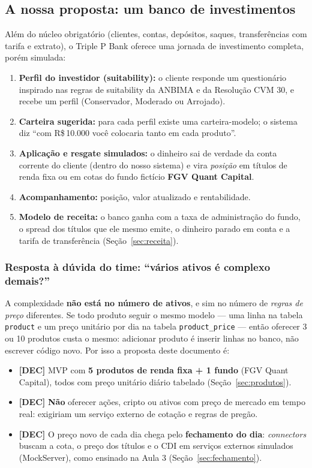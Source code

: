 \documentclass[11pt,a4paper]{article}
\newcommand{\banco}{Triple P Bank}            %
\newcommand{\fundo}{FGV Quant Capital}     %
\newcommand{\dec}{\textbf{[DEC]}}          %
\newcommand{\rs}{R\$\,}
\newcommand{\tb}[1]{\texttt{#1}}           %
\begin{document}
\subsection{A nossa proposta: um banco de investimentos}

Além do núcleo obrigatório (clientes, contas, depósitos, saques, transferências com tarifa e
extrato), o \banco{} oferece uma jornada de investimento completa, porém simulada:

\begin{enumerate}
  \item \textbf{Perfil do investidor (suitability):} o cliente responde um questionário
        inspirado nas regras de suitability da ANBIMA e da Resolução CVM 30, e recebe um perfil
        (Conservador, Moderado ou Arrojado).
  \item \textbf{Carteira sugerida:} para cada perfil existe uma carteira-modelo; o sistema
        diz ``com \rs 10.000 você colocaria tanto em cada produto''.
  \item \textbf{Aplicação e resgate simulados:} o dinheiro sai de verdade da conta corrente
        do cliente (dentro do nosso sistema) e vira \emph{posição} em títulos de renda fixa ou
        em cotas do fundo fictício \textbf{\fundo}.
  \item \textbf{Acompanhamento:} posição, valor atualizado e rentabilidade.
  \item \textbf{Modelo de receita:} o banco ganha com a taxa de administração do fundo, o spread
        dos títulos que ele mesmo emite, o dinheiro parado em conta e a tarifa de transferência
        (Seção~\ref{sec:receita}).
\end{enumerate}

\subsubsection*{Resposta à dúvida do time: ``vários ativos é complexo demais?''}

A complexidade \textbf{não está no número de ativos}, e sim no número de \emph{regras de preço}
diferentes. Se todo produto seguir o mesmo modelo --- uma linha na tabela \tb{product} e um
preço unitário por dia na tabela \tb{product_price} --- então oferecer 3 ou 10 produtos custa o
mesmo: adicionar produto é inserir linhas no banco, não escrever código novo. Por isso a
proposta deste documento é:

\begin{itemize}
  \item \dec{} MVP com \textbf{5 produtos de renda fixa + 1 fundo} (\fundo), todos com preço
        unitário diário tabelado (Seção~\ref{sec:produtos}).
  \item \dec{} \textbf{Não} oferecer ações, cripto ou ativos com preço de mercado em tempo
        real: exigiriam um serviço externo de cotação e regras de pregão.
  \item \dec{} O preço novo de cada dia chega pelo \textbf{fechamento do dia}: \emph{connectors}
        buscam a cota, o preço dos títulos e o CDI em serviços externos simulados (MockServer),
        como ensinado na Aula 3 (Seção~\ref{sec:fechamento}).
\end{itemize}
\end{document}

